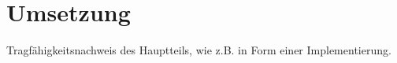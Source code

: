 \chapter{Umsetzung}
\label{sec:umsetzung}

Tragfähigkeitsnachweis des Hauptteils, wie z.B. in Form einer Implementierung.
